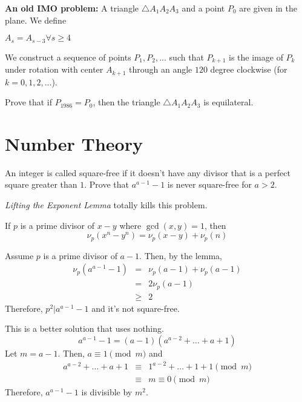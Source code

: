 \documentclass{subfile}
\begin{document}
	\newpage
	\begin{problem}
		\textbf{An old IMO problem:} A triangle $\triangle A_{1}A_{2}A_{3}$ and a point $P_{0}$ are given in the plane. We define
		
		\begin{center} $A_{s}=A_{s-3} \forall s\geq 4$ \end{center}
		
		We construct a sequence of points $P_{1},P_{2},...$ such that $P_{k+1}$ is the image of $P_{k}$ under rotation with center $A_{k+1}$ through an angle $120$ degree clockwise (for $k=0,1,2,...$).
		
		Prove that if $P_{1986}=P_{0}$, then the triangle $\triangle A_{1}A_{2}A_{3}$ is equilateral. 
	\end{problem}
	

		
		\newpage
		
		\section{Number Theory}
		
		\begin{problem}
			An integer is called square-free if it doesn't have any divisor that is a perfect square greater than $1$. Prove that $a^{a-1}-1$ is never square-free for $a>2$.
		\end{problem}
		
		\begin{solution}[\bf First]
			\textit{Lifting the Exponent Lemma} totally kills this problem.
			
			\begin{lemma}
				If $p$ is a prime divisor of $x-y$ where $\gcd(x,y)=1$, then \[\nu_p(x^n-y^n)=\nu_p(x-y)+\nu_p(n)\]
			\end{lemma} 
			
			Assume $p$ is a prime divisor of $a-1$. Then, by the lemma,
			\begin{eqnarray*}
				\nu_p(a^{a-1}-1) & = & \nu_p(a-1)+\nu_p(a-1)\\
				& = & 2\nu_p(a-1)\\
				&\geq&2
			\end{eqnarray*}
			Therefore, $p^2|a^{a-1}-1$ and it's not square-free.
		\end{solution}
		
		\begin{solution}[\bf Second]
			This is a better solution that uses nothing.
			\[a^{a-1}-1=(a-1)(a^{a-2}+\ldots+a+1)\]
			Let $m=a-1$. Then, $a\equiv1\pmod m$ and
			\begin{eqnarray*}
				a^{a-2}+\ldots+a+1  &\equiv& 1^{a-2}+\ldots+1+1\pmod m\\
				&\equiv&m\equiv0\pmod m
			\end{eqnarray*}
			Therefore, $a^{a-1}-1$ is divisible by $m^2$.
		\end{solution}
		
\end{document}
